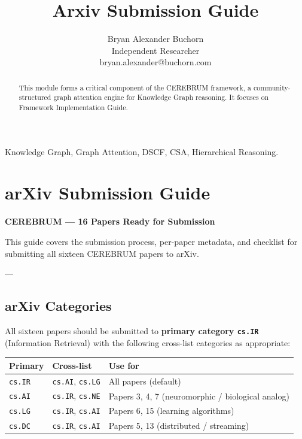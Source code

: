 \documentclass[10pt,journal,compsoc]{IEEEtran}
\begin{document}
\title{Arxiv Submission Guide}
\author{Bryan Alexander Buchorn \\ Independent Researcher \\ bryan.alexander@buchorn.com}

\maketitle

\begin{abstract}
This module forms a critical component of the CEREBRUM framework, a community-structured graph attention engine for Knowledge Graph reasoning. It focuses on Framework Implementation Guide.
\end{abstract}

\begin{IEEEkeywords}
Knowledge Graph, Graph Attention, DSCF, CSA, Hierarchical Reasoning.
\end{IEEEkeywords}

\section{arXiv Submission Guide}

\textbf{CEREBRUM — 16 Papers Ready for Submission}

This guide covers the submission process, per-paper metadata, and checklist for submitting all sixteen CEREBRUM papers to arXiv.

---

\subsection{arXiv Categories}

All sixteen papers should be submitted to \textbf{primary category \texttt{cs.IR}} (Information Retrieval) with the following cross-list categories as appropriate:

\begin{center}
{\footnotesize
\begin{tabularx}{\columnwidth}{|>{\raggedright\arraybackslash}X|>{\raggedright\arraybackslash}X|>{\raggedright\arraybackslash}X|}
\hline
Primary & Cross-list & Use for \\ \hline
\texttt{cs.IR} & \texttt{cs.AI}, \texttt{cs.LG} & All papers (default) \\ \hline
\texttt{cs.AI} & \texttt{cs.IR}, \texttt{cs.NE} & Papers 3, 4, 7 (neuro\-morphic / biological analog) \\ \hline
\texttt{cs.LG} & \texttt{cs.IR}, \texttt{cs.AI} & Papers 6, 15 (learning algorithms) \\ \hline
\texttt{cs.DC} & \texttt{cs.IR}, \texttt{cs.AI} & Papers 5, 13 (distributed / streaming) \\ \hline
\end{tabularx}
}
\end{center}
\end{document}

